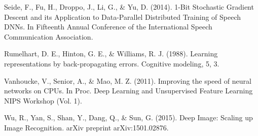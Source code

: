 \documentclass{article} %
\begin{document}
{Seide, F., Fu, H., Droppo, J., Li, G., \& Yu, D. (2014). 1-Bit Stochastic Gradient Descent and its Application to Data-Parallel Distributed Training of Speech DNNs. In Fifteenth Annual Conference of the International Speech Communication Association.

Rumelhart, D. E., Hinton, G. E., \& Williams, R. J. (1988). Learning representations by back-propagating errors. Cognitive modeling, 5, 3.

Vanhoucke, V., Senior, A., \& Mao, M. Z. (2011). Improving the speed of neural networks on CPUs. In Proc. Deep Learning and Unsupervised Feature Learning NIPS Workshop (Vol. 1).

Wu, R., Yan, S., Shan, Y., Dang, Q., \& Sun, G. (2015). Deep Image: Scaling up Image Recognition. arXiv
preprint arXiv:1501.02876.
}
\end{document}
